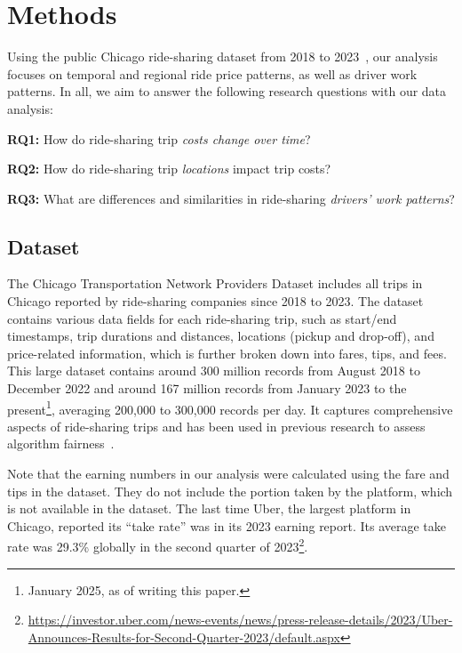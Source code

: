 \section{Methods}
\label{sec:methods}

Using the public Chicago ride-sharing dataset from 2018 to 2023~\cite{chicago_tnp_2018, chicago_tnp_2023}, our analysis focuses on temporal and regional ride price patterns, as well as driver work patterns. In all, we aim to answer the following research questions with our data analysis:


\textbf{RQ1:} How do ride-sharing trip \textit{costs change over time}?

\textbf{RQ2:} How do ride-sharing trip \textit{locations} impact trip costs?

\textbf{RQ3:} What are differences and similarities in ride-sharing \textit{drivers' work patterns}?


\subsection{Dataset}

The Chicago Transportation Network Providers Dataset includes all trips in Chicago reported by ride-sharing companies since 2018 to 2023. The dataset contains various data fields for each ride-sharing trip, such as start/end timestamps, trip durations and distances, locations (pickup and drop-off), and price-related information, which is further broken down into fares, tips, and fees. This large dataset contains around 300 million records from August 2018 to December 2022 and around 167 million records from January 2023 to the present\footnote{January 2025, as of writing this paper.}, averaging 200,000 to 300,000 records per day. It captures comprehensive aspects of ride-sharing trips and has been used in previous research to assess algorithm fairness~\cite{zhang2024data, manzo2022improving}.

Note that the earning numbers in our analysis were calculated using the fare and tips in the dataset. They do not include the portion taken by the platform, which is not available in the dataset. The last time Uber, the largest platform in Chicago, reported its ``take rate'' was in its 2023 earning report. Its average take rate was 29.3\% globally in the second quarter of 2023\footnote{\url{https://investor.uber.com/news-events/news/press-release-details/2023/Uber-Announces-Results-for-Second-Quarter-2023/default.aspx}}.  

